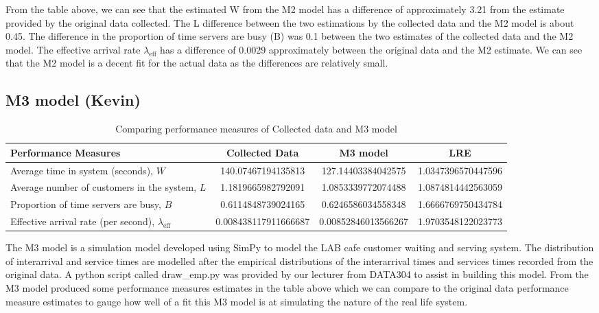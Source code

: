 \documentclass{article}
\begin{document}
From the table above, we can see that the estimated W from the M2 model has a difference of approximately 3.21 from the estimate provided by the original data collected. The L difference between the two estimations by the collected data and the M2 model is about 0.45. The difference in the proportion of time servers are busy (B) was 0.1 between the two estimates of the collected data and the M2 model. The effective arrival rate $\lambda_{\text{eff}}$ has a difference of 0.0029 approximately between the original data and the M2 estimate. We can see that the M2 model is a decent fit for the actual data as the differences are relatively small.



\subsection{M3 model (Kevin)}

\begin{table}[H]
    \centering
    \caption{Comparing performance measures of Collected data and M3 model}
    \begin{tabu}{X S S S}
        \toprule
        \textbf{Performance Measures} & \textbf{Collected Data} & \textbf{M3 model}& \textbf{LRE}\\
        \midrule
        Average time in system (seconds), $W$ & 140.07467194135813 & 127.14403384042575 & 1.0347396570447596\\
        Average number of customers in the system, $L$ & 1.1819665982792091 & 1.0853339772074488 & 1.0874814442563059\\
        Proportion of time servers are busy, $B$ & 0.6114848739024165 & 0.6246586034558348 & 1.6666769750434784\\
        Effective arrival rate (per second), $\lambda_{\text{eff}}$ & 0.008438117911666687 & 0.00852846013566267 & 1.9703548122023773\\
        \bottomrule
    \end{tabu}
    \label{tab:M3}
\end{table}

The M3 model is a simulation model developed using SimPy to model the LAB cafe customer waiting and serving system. The distribution of interarrival and service times are modelled after the empirical distributions of the interarrival times and services times recorded from the original data. A python script called draw\_emp.py was provided by our lecturer\cite{drawemp} from DATA304 to assist in building this model. From the M3 model produced some performance measures estimates in the table above which we can compare to the original data performance measure estimates to gauge how well of a fit this M3 model is at simulating the nature of the real life system.
\end{document}
